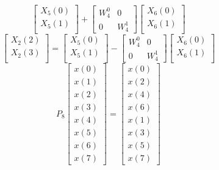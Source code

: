 \documentclass[journal,12pt,twocolumn]{IEEEtran}
\renewcommand\thesection{\arabic{section}}
\begin{document}
\begin{enumerate}[label=\arabic*.,ref=\thesection.\theenumi]
\begin{equation}
\begin{bmatrix}
X_{5}(0) \\ 
X_{5}(1)\\ 
\end{bmatrix}
+
\begin{bmatrix}
W^{0}_{4} & 0\\
0 & W^{1}_{4}
\end{bmatrix}
\begin{bmatrix}
X_{6}(0) \\ 
X_{6}(1) \\ 
\end{bmatrix}
\end{equation}
\begin{equation}
\begin{bmatrix}
X_{2}(2) \\ 
X_{2}(3)\\ 
\end{bmatrix}
=
\begin{bmatrix}
X_{5}(0) \\ 
X_{5}(1)\\ 
\end{bmatrix}
-
\begin{bmatrix}
W^{0}_{4} & 0\\
0 & W^{1}_{4}
\end{bmatrix}
\begin{bmatrix}
X_{6}(0) \\ 
X_{6}(1) \\ 
\end{bmatrix}
\end{equation}
\begin{equation}
P_{8}
\begin{bmatrix}
x(0) \\ 
x(1) \\ 
x(2) \\ 
x(3) \\ 
x(4) \\ 
x(5) \\
x(6) \\
x(7)
\end{bmatrix}
 = 
\begin{bmatrix}
x(0) \\ 
x(2) \\ 
x(4) \\ 
x(6) \\
x(1) \\ 
x(3) \\ 
x(5) \\
x(7)
\end{bmatrix}
\end{equation}
\begin{equation}

\end{equation}
\end{enumerate}
\end{document}
